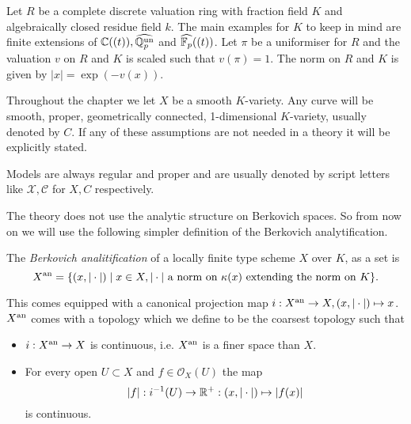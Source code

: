 Let $R$ be a complete discrete valuation ring with fraction field $K$ and algebraically closed residue field $k$. 
The main examples for $K$ to keep in mind are finite extensions of $\mathbb{C}((t)), \widehat{\mathbb{Q}_p^{\text{un}}} $ and $\widehat{\mathbb{F}_p}((t))$.  
Let $\pi$ be a uniformiser for $R$ and the valuation $v$ on $R$ and $K$ is scaled such that $v(\pi) = 1$. 
The norm on $R$ and $K$ is given by $|x| = \exp(-v(x))$. 

Throughout the chapter we let $X$ be a smooth $K$-variety. 
Any curve will be smooth, proper, geometrically connected, 1-dimensional $K$-variety, usually denoted by $C$. 
If any of these assumptions are not needed in a theory it will be explicitly stated. 

Models are always regular and proper and are usually denoted by script letters like $\mathscr X, \mathscr C$ for $X, C$ respectively.  

The theory does not use the analytic structure on Berkovich spaces. 
So from now on we will use the following simpler definition of the Berkovich analytification. 

\begin{definition}\label{def:berkovich_analytification_explicit}
	The \emph{Berkovich analitification} of a locally finite type scheme $X$ over  $K$, as a set is \[
		X{}^{\text{an}} = \{(x, |\cdot |)  \mid x\in X, |\cdot | \text{ a norm on } \kappa(x) \text{ extending the norm on }K \} 
	.\] 

	This comes equipped with a canonical projection map $i: X{}^{\text{an}} \to X, (x, |\cdot |) \mapsto  x$.
	$X{}^{\text{an}} $ comes with a topology which we define to be the coarsest topology such that 
	\begin{itemize}
		\item $i: X{}^{\text{an}} \to X$ is continuous, i.e. $X{}^{\text{an}}$ is a finer space than  $X$. 
		\item For every open $U \subset X$ and $f \in \mathcal{O}_X(U)$ the map  \[
				|f|: i^{-1}(U) \to \mathbb{R}^{+}: (x, |\cdot |) \mapsto  |f(x)|
		\] 
		is continuous.
	\end{itemize}
\end{definition}

